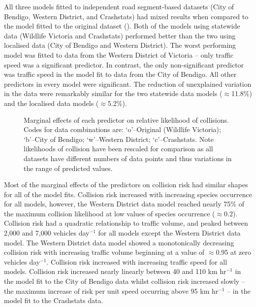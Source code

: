 All three models fitted to independent road segment-based datasets (City of Bendigo, Western District, and Crashstats) had mixed results when compared to the model fitted to the original dataset (). Both of the models using statewide data (Wildlife Victoria and Crashstats) performed better than the two using localised data (City of Bendigo and Western District). The worst performing model was fitted to data from the Western District of Victoria -- only traffic speed was a significant predictor. In contrast, the only non-significant predictor was traffic speed in the model fit to data from the City of Bendigo. All other predictors in every model were significant. The reduction of unexplained variation in the data were remarkably similar for the two statewide data models ($\approx$11.8\%) and the localised data models ($\approx$5.2\%).

\begin{figure*}[!t]
  \centering
  \caption[Marginal effects of predictor variables on relative likelihood of collision using independent datasets to train models]{Marginal effects of each predictor on relative likelihood of collisions. Codes for data combinations are: `o'--Original (Wildlife Victoria); `b'--City of Bendigo; `w'--Western District; `c'--Crashstats. Note likelihoods of collision have been rescaled for comparison as all datasets have different numbers of data points and thus variations in the range of predicted values.}
  \label{val_effects}
\end{figure*}

Most of the marginal effects of the predictors on collision risk had similar shapes for all of the model fits. Collision risk increased with increasing species occurrence for all models, however, the Western District data model reached nearly 75\% of the maximum collision likelihood at low values of species occurrence ($\approx$0.2). Collision risk had a quadratic relationship to traffic volume, and peaked between 2,000 and 7,000 vehicles day$^{-1}$ for all models except the Western District data model. The Western District data model showed a monotonically decreasing collision risk with increasing traffic volume beginning at a value of $\approx$0.95 at zero vehicles day$^{-1}$. Collision risk increased with increasing traffic speed for all models. Collision risk increased nearly linearly between 40 and 110 km hr$^{-1}$ in the model fit to the City of Bendigo data whilst collision risk increased slowly -- the maximum increase of risk per unit speed occurring above 95 km hr$^{-1}$ -- in the model fit to the Crashstats data.


